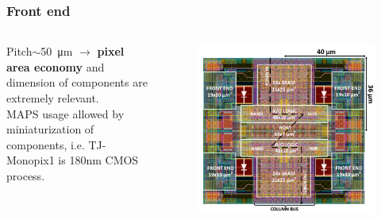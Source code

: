     \begin{frame}[noframenumbering]
        \frametitle{Front end}
            \begin{columns}
                Pitch$\sim$\SI{50}{\um} $\rightarrow$ \textbf{pixel area economy} and dimension of components are extremely relevant. \\\smallskip
                MAPS usage allowed by miniaturization of components, i.e. TJ-Monopix1 is 180{nm} CMOS process.\\
                    \begin{figure}[h!]
                        \vspace*{-1.05cm}\hspace*{-0.9cm}
                        \includegraphics[width=1.18\linewidth]{figures/Monopix1/Monopix1_2x2pixelsgroup.png}
                    \end{figure}
            \end{columns}


\end{frame}
